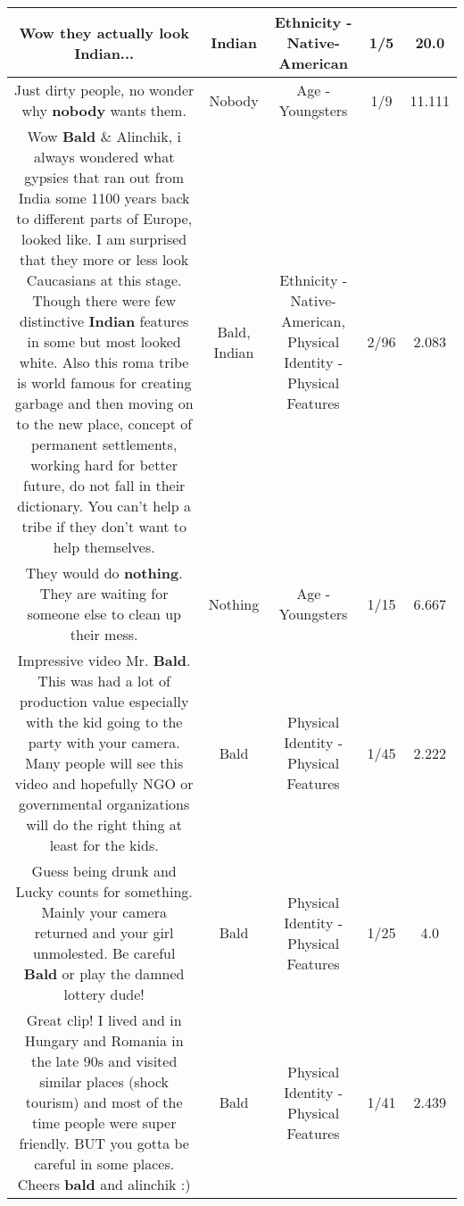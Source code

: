 \documentclass[11pt]{article}
\newlength\mylength
\begin{document}
\begin{center}
\begin{longtable}{|C{.65\mylength}|C{.30\mylength}|C{.12\mylength}|C{.12\mylength}|C{.12\mylength}|}
  \small Wow they actually look \textbf{Indian}...\normalsize   & Indian & Ethnicity - Native-American & 1/5 & 20.0 \\  \hline
  \small Just dirty people, no wonder why \textbf{nobody} wants them.\normalsize   & Nobody & Age - Youngsters & 1/9 & 11.111 \\  \hline
  \small Wow \textbf{Bald} \& Alinchik, i always wondered what gypsies that ran out from India some 1100 years back to different parts of Europe, looked like. I am surprised that they more or less look Caucasians at this stage. Though there were few distinctive \textbf{Indian} features in some but most looked white. Also this roma tribe is world famous for creating garbage and then moving on to the new place, concept of permanent settlements, working hard for better future, do not fall in their dictionary. You can't help a tribe if they don't want to help themselves.\normalsize   & Bald, Indian & Ethnicity - Native-American, Physical Identity - Physical Features & 2/96 & 2.083 \\  \hline
  \small They would do \textbf{nothing}. They are waiting for someone else to clean up their mess.\normalsize   & Nothing & Age - Youngsters & 1/15 & 6.667 \\  \hline
  \small Impressive video Mr. \textbf{Bald}. This was had a lot of production value especially with the kid going to the party with your camera. Many people will see this video and hopefully NGO or governmental organizations will do the right thing at least for the kids.\normalsize   & Bald & Physical Identity - Physical Features & 1/45 & 2.222 \\  \hline
  \small Guess being drunk and Lucky counts for something. Mainly your camera returned and your girl unmolested. Be careful \textbf{Bald} or play the damned lottery dude!\normalsize   & Bald & Physical Identity - Physical Features & 1/25 & 4.0 \\  \hline
  \small Great clip! I lived and in Hungary and Romania in the late 90s and visited similar places (shock tourism) and most of the time people were super friendly. BUT you gotta be careful in some places. Cheers \textbf{bald} and alinchik :)\normalsize   & Bald & Physical Identity - Physical Features & 1/41 & 2.439 \\  \hline

\end{longtable}
\end{center}
\end{document}
